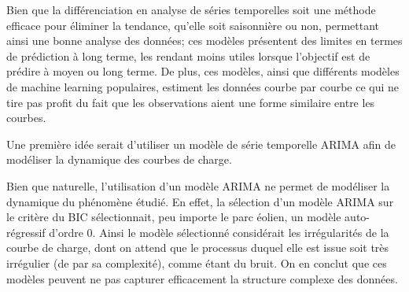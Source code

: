 Bien que la différenciation en analyse de séries temporelles soit une méthode efficace pour éliminer la tendance, qu'elle soit saisonnière ou non, permettant ainsi une bonne analyse des données; ces modèles présentent des limites en termes de prédiction à long terme, les rendant moins utiles lorsque l'objectif est de prédire à moyen ou long terme. De plus, ces modèles, ainsi que différents modèles de machine learning populaires, estiment les données courbe par courbe ce qui ne tire pas profit du fait que les observations aient une forme similaire entre les courbes.

\smallskip

Une première idée serait d'utiliser un modèle de série temporelle ARIMA afin de modéliser la dynamique des courbes de charge.





Bien que naturelle, l'utilisation d'un modèle ARIMA ne permet de modéliser la dynamique du phénomène étudié. En effet, la sélection d'un modèle ARIMA sur le critère du BIC sélectionnait, peu importe le parc éolien, un modèle auto-régressif d'ordre 0. Ainsi le modèle sélectionné considérait les irrégularités de la courbe de charge, dont on attend que le processus duquel elle est issue soit très irrégulier (de par sa complexité), comme étant du bruit. On en conclut que ces modèles peuvent ne pas capturer efficacement la structure complexe des données.